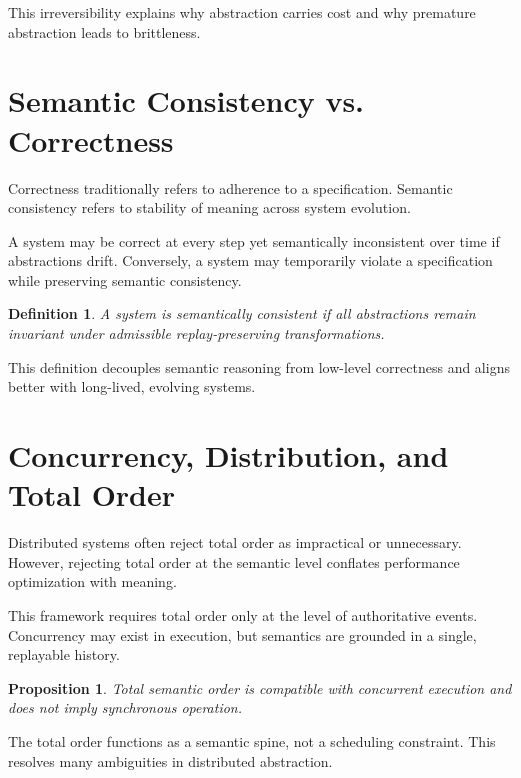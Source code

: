 \documentclass[11pt]{article}
\newtheorem{definition}{Definition}[section]
\newtheorem{proposition}{Proposition}[section]
\begin{document}
This irreversibility explains why abstraction carries cost and why premature abstraction leads to brittleness.

\section{Semantic Consistency vs. Correctness}

Correctness traditionally refers to adherence to a specification. Semantic consistency refers to stability of meaning across system evolution.

A system may be correct at every step yet semantically inconsistent over time if abstractions drift. Conversely, a system may temporarily violate a specification while preserving semantic consistency.

\begin{definition}
A system is semantically consistent if all abstractions remain invariant under admissible replay-preserving transformations.
\end{definition}

This definition decouples semantic reasoning from low-level correctness and aligns better with long-lived, evolving systems.

\section{Concurrency, Distribution, and Total Order}

Distributed systems often reject total order as impractical or unnecessary. However, rejecting total order at the semantic level conflates performance optimization with meaning.

This framework requires total order only at the level of authoritative events. Concurrency may exist in execution, but semantics are grounded in a single, replayable history.

\begin{proposition}
Total semantic order is compatible with concurrent execution and does not imply synchronous operation.
\end{proposition}

The total order functions as a semantic spine, not a scheduling constraint. This resolves many ambiguities in distributed abstraction.
\end{document}
